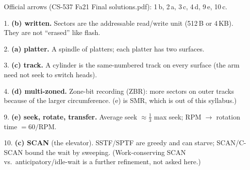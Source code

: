 \documentclass[11pt,a4paper]{article}
\newenvironment{Sol}{%
  \begin{tcolorbox}[sboxstyle, title={Solution}]%
}{%
  \end{tcolorbox}\vspace{0.35em}%
}
\begin{document}
\begin{Sol}
Official arrows (CS-537 Fa21 Final solutions.pdf):
1\,b, 2\,a, 3\,c, 4\,d, 9\,e, 10\,c.

1. \textbf{(b) written.} Sectors are the addressable read/write unit
(512\,B or 4\,KB). They are not ``erased'' like flash.

2. \textbf{(a) platter.} A spindle of platters; each platter has two
surfaces.

3. \textbf{(c) track.} A cylinder is the same-numbered track on every
surface (the arm need not seek to switch heads).

4. \textbf{(d) multi-zoned.} Zone-bit recording (ZBR): more sectors on
outer tracks because of the larger circumference. (e) is SMR, which is
out of this syllabus.)

9. \textbf{(e) seek, rotate, transfer.} Average seek $\approx
\tfrac13$ max seek; RPM $\to$ rotation time $=60/\mathrm{RPM}$.

10. \textbf{(c) SCAN} (the elevator). SSTF/SPTF are greedy and can
starve; SCAN/C-SCAN bound the wait by sweeping. (Work-conserving SCAN
vs.\ anticipatory/idle-wait is a further refinement, not asked here.)
\end{Sol}
\end{document}
